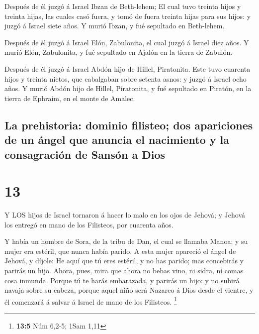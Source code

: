  Después de él juzgó á Israel Ibzan de Beth-lehem;
 El cual tuvo treinta hijos y treinta hijas, las cuales casó
fuera, y tomó de fuera treinta hijas para sus hijos: y juzgó á Israel
siete años.  Y murió Ibzan, y fué sepultado en Beth-lehem.

 Después de él juzgó á Israel Elón, Zabulonita, el cual
juzgó á Israel diez años.  Y murió Elón, Zabulonita, y fué
sepultado en Ajalón en la tierra de Zabulón.

 Después de él juzgó á Israel Abdón hijo de Hillel,
Piratonita.  Este tuvo cuarenta hijos y treinta nietos, que
cabalgaban sobre setenta asnos: y juzgó á Israel ocho años.
 Y murió Abdón hijo de Hillel, Piratonita, y fué sepultado
en Piratón, en la tierra de Ephraim, en el monte de Amalec.

\hypertarget{la-prehistoria-dominio-filisteo-dos-apariciones-de-un-uxe1ngel-que-anuncia-el-nacimiento-y-la-consagraciuxf3n-de-sansuxf3n-a-dios}{%
\subsection{La prehistoria: dominio filisteo; dos apariciones de un
ángel que anuncia el nacimiento y la consagración de Sansón a
Dios}\label{la-prehistoria-dominio-filisteo-dos-apariciones-de-un-uxe1ngel-que-anuncia-el-nacimiento-y-la-consagraciuxf3n-de-sansuxf3n-a-dios}}

\hypertarget{section-12}{%
\section{13}\label{section-12}}

 Y LOS hijos de Israel tornaron á hacer lo malo en los ojos
de Jehová; y Jehová los entregó en mano de los Filisteos, por cuarenta
años.

 Y había un hombre de Sora, de la tribu de Dan, el cual se
llamaba Manoa; y su mujer era estéril, que nunca había parido.
 A esta mujer apareció el ángel de Jehová, y díjole: He aquí
que tú eres estéril, y no has parido; mas concebirás y parirás un hijo.
 Ahora, pues, mira que ahora no bebas vino, ni sidra, ni
comas cosa inmunda.  Porque tú te harás embarazada, y
parirás un hijo: y no subirá navaja sobre su cabeza, porque aquel niño
será Nazareo á Dios desde el vientre, y él comenzará á salvar á Israel
de mano de los Filisteos. \footnote{\textbf{13:5} Núm 6,2-5; 1Sam 1,11}

